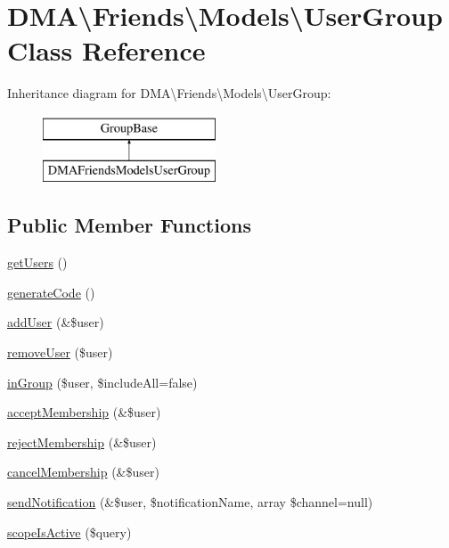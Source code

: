 \hypertarget{classDMA_1_1Friends_1_1Models_1_1UserGroup}{}\section{D\+M\+A\textbackslash{}Friends\textbackslash{}Models\textbackslash{}User\+Group Class Reference}
\label{classDMA_1_1Friends_1_1Models_1_1UserGroup}
Inheritance diagram for D\+M\+A\textbackslash{}Friends\textbackslash{}Models\textbackslash{}User\+Group\+:\begin{figure}[H]
\begin{center}
\leavevmode
\includegraphics[height=2.000000cm]{d2/daf/classDMA_1_1Friends_1_1Models_1_1UserGroup}
\end{center}
\end{figure}
\subsection*{Public Member Functions}
\begin{DoxyCompactItemize}
\item 
\hyperlink{classDMA_1_1Friends_1_1Models_1_1UserGroup_a7f998f837a0bd734e0f1496f6902793f}{get\+Users} ()
\item 
\hyperlink{classDMA_1_1Friends_1_1Models_1_1UserGroup_af7f583bd7db92cfdc21eb4e5ed7bdabb}{generate\+Code} ()
\item 
\hyperlink{classDMA_1_1Friends_1_1Models_1_1UserGroup_a13eaffc2b414fe5dfd42aa6ac5fe75ca}{add\+User} (\&\$user)
\item 
\hyperlink{classDMA_1_1Friends_1_1Models_1_1UserGroup_ac08ee6038b5f0314c341123025484b91}{remove\+User} (\$user)
\item 
\hyperlink{classDMA_1_1Friends_1_1Models_1_1UserGroup_aab0755a408dcbff4a64277cd9032b9bf}{in\+Group} (\$user, \$include\+All=false)
\item 
\hyperlink{classDMA_1_1Friends_1_1Models_1_1UserGroup_ac55e9a0b178ed308374720c3dd9d7f90}{accept\+Membership} (\&\$user)
\item 
\hyperlink{classDMA_1_1Friends_1_1Models_1_1UserGroup_a09e0cf14a97b5618bd5db36dc320bf7e}{reject\+Membership} (\&\$user)
\item 
\hyperlink{classDMA_1_1Friends_1_1Models_1_1UserGroup_a0e21f8d83c3a53b9119fff9395da55a4}{cancel\+Membership} (\&\$user)
\item 
\hyperlink{classDMA_1_1Friends_1_1Models_1_1UserGroup_a4b341d8ba24955f26f2d0dc9d8dbc0ab}{send\+Notification} (\&\$user, \$notification\+Name, array \$channel=null)
\item 
\hyperlink{classDMA_1_1Friends_1_1Models_1_1UserGroup_af5985b34eee59820cb9ac6c28c01b725}{scope\+Is\+Active} (\$query)
\end{DoxyCompactItemize}
